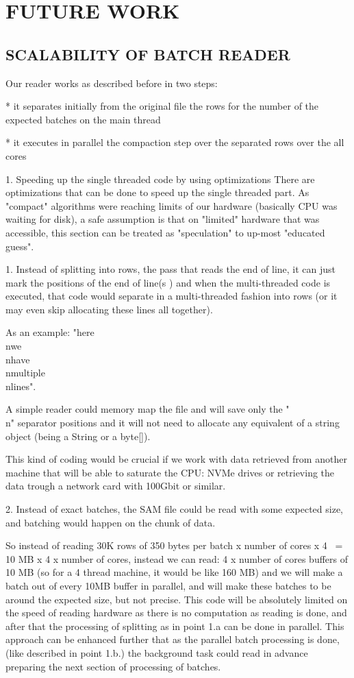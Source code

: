 \documentclass[a4paper,twoside]{article}
\begin{document}
\section{\uppercase{Future work}}

\subsection{\uppercase{Scalability of batch reader}}

Our reader works as described before in two steps:

* it separates initially from the original file the rows for the number of the expected batches on the main thread

* it executes in parallel the compaction step over the separated rows over the all cores

1. Speeding up the single threaded code by using optimizations
There are optimizations that can be done to speed up the single threaded part.
As "compact" algorithms were reaching limits of our hardware (basically CPU was waiting for disk), a safe assumption is
that on "limited" hardware that was accessible, this section can be treated as "speculation" to up-most "educated guess".

1. Instead of splitting into rows, the pass that reads the end of line, it can just mark the positions of the end of line(s
) and when the multi-threaded code is executed, that code would separate in a multi-threaded fashion into rows (or it may even skip allocating these lines all together).

As an example: "here\\nwe\\nhave\\nmultiple\\nlines".

A simple reader could memory map the file and will save only the "\\n" separator positions and it will not need to allocate any equivalent of a string object
(being a String or a byte[]).

This kind of coding would be crucial if we work with data retrieved from another machine that will be able to saturate the CPU:
NVMe drives or retrieving the data trough a network card with 100Gbit or similar.

2. Instead of exact batches, the SAM file could be read with some expected size, and batching would happen on the chunk of data.

So instead of reading 30K rows of 350 bytes per batch x number of cores x 4 ~= 10 MB x 4 x number of cores, instead we can read:
4 x number of cores buffers of 10 MB (so for a 4 thread machine, it would be like 160 MB) and we will make a batch out of every 10MB buffer in parallel, and will make these batches to be 
around the expected size, but not precise.
This code will be absolutely limited on the speed of reading hardware as there is no computation as reading is done, and after that the processing of splitting 
as in point 1.a can be done in parallel. This approach can be enhanced further that as the parallel batch processing is done, (like described in point 1.b.) 
the background task could read in advance preparing the next section of processing of batches.
\end{document}
